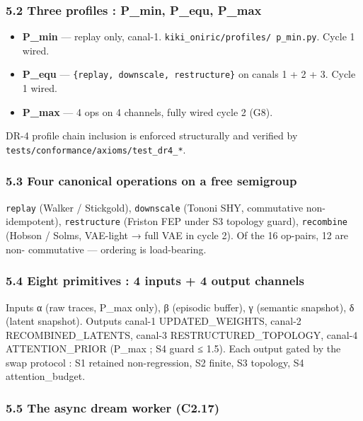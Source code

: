 \documentclass[
]{article}
\providecommand{\tightlist}{%
  \setlength{\itemsep}{0pt}\setlength{\parskip}{0pt}}
\begin{document}
\subsubsection{5.2 Three profiles : P\_min, P\_equ,
P\_max}\label{three-profiles-p_min-p_equ-p_max}

\begin{itemize}
\tightlist
\item
  \textbf{P\_min} --- replay only, canal-1.
  \texttt{kiki\_oniric/profiles/\ p\_min.py}. Cycle 1 wired.
\item
  \textbf{P\_equ} --- \texttt{\{replay,\ downscale,\ restructure\}} on
  canals 1 + 2 + 3. Cycle 1 wired.
\item
  \textbf{P\_max} --- 4 ops on 4 channels, fully wired cycle 2 (G8).
\end{itemize}

DR-4 profile chain inclusion is enforced structurally and verified by
\texttt{tests/conformance/axioms/test\_dr4\_*}.

\subsubsection{5.3 Four canonical operations on a free
semigroup}\label{four-canonical-operations-on-a-free-semigroup}

\texttt{replay} (Walker / Stickgold), \texttt{downscale} (Tononi SHY,
commutative non-idempotent), \texttt{restructure} (Friston FEP under S3
topology guard), \texttt{recombine} (Hobson / Solms, VAE-light → full
VAE in cycle 2). Of the 16 op-pairs, 12 are non- commutative ---
ordering is load-bearing.

\subsubsection{5.4 Eight primitives : 4 inputs + 4 output
channels}\label{eight-primitives-4-inputs-4-output-channels}

Inputs α (raw traces, P\_max only), β (episodic buffer), γ (semantic
snapshot), δ (latent snapshot). Outputs canal-1 UPDATED\_WEIGHTS,
canal-2 RECOMBINED\_LATENTS, canal-3 RESTRUCTURED\_TOPOLOGY, canal-4
ATTENTION\_PRIOR (P\_max ; S4 guard ≤ 1.5). Each output gated by the
swap protocol : S1 retained non-regression, S2 finite, S3 topology, S4
attention\_budget.

\subsubsection{5.5 The async dream worker
(C2.17)}\label{the-async-dream-worker-c2.17}
\end{document}
